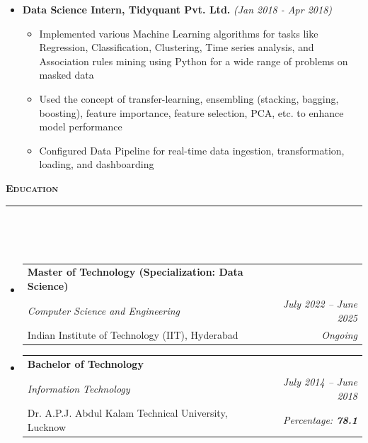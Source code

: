 \documentclass[a4paper,10pt]{article}
\makeatletter
\newcommand{\isep}{-2 pt}
\newcommand{\lsep}{-0.5cm}
\newcommand{\resheading}[1]{{\small
        {
            \begin{minipage}
                {0.992\textwidth}\textbf{{\textsc{#1 \vphantom{p\^{E}} }}}
                \\[-0.3cm]
                \hrule
            \end{minipage}
            \\[-0.5cm]
        }
 }}
\newcommand{\resEduHeading}[6]{
  \begin{tabular*}{7.1in}{l @{\extracolsep{\fill}} r}
    \textbf{\large #1} \\
    \textit{#2} & \textit{#3} \\
    {\large #4} & \textit{{#5} \textbf{#6}}
  \end{tabular*}
}
\makeatother
\begin{document}
\begin{itemize}
    \item \textbf{Data Science Intern, Tidyquant Pvt. Ltd.} \hfill {\emph{(Jan 2018 - Apr 2018)}}
    \\ [-0.6cm]
    \begin{itemize}\itemsep \isep
        \item Implemented various Machine Learning algorithms for tasks like Regression, Classification, Clustering, Time series analysis, and Association rules mining using Python for a wide range of problems on masked data 
        \item Used the concept of transfer-learning, ensembling (stacking, bagging, boosting), feature importance, feature selection, PCA, etc. to enhance model performance 
        \item Configured Data Pipeline for real-time data ingestion, transformation, loading, and dashboarding
    \\ [-0.5cm]
    \end{itemize}
\end{itemize}

\noindent
\resheading{\textbf{\large Education}}\\[\lsep]
\vspace{8pt}
\begin{itemize}
    \item \resEduHeading{Master of Technology (Specialization: Data Science)}
    {Computer Science and Engineering}
    {July 2022 -- June 2025}
    {Indian Institute of Technology (IIT), Hyderabad}
    {Ongoing}
    {}
    \item \resEduHeading{Bachelor of Technology}
    {Information Technology}
    {July 2014 -- June 2018}
    {Dr. A.P.J. Abdul Kalam Technical University, Lucknow}
    {Percentage:}
    {78.1}
\end{itemize}
\end{document}

